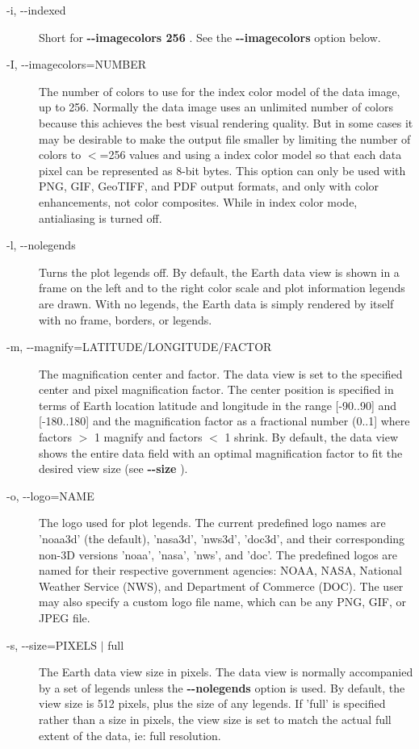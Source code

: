 \begin{description}
\item[-i, -{-}indexed]Short for \textbf{-{-}imagecolors 256}
. See the \textbf{-{-}imagecolors}
 option below.
\item[-I, -{-}imagecolors=NUMBER]The number of colors to use for the index color model of the data image, up to 256. Normally the data image uses an unlimited number of colors because this achieves the best visual rendering quality. But in some cases it may be desirable to make the output file smaller by limiting the number of colors to $<$=256 values and using a index color model so that each data pixel can be represented as 8-bit bytes. This option can only be used with PNG, GIF, GeoTIFF, and PDF output formats, and only with color enhancements, not color composites. While in index color mode, antialiasing is turned off.
\item[-l, -{-}nolegends]Turns the plot legends off. By default, the Earth data view is shown in a frame on the left and to the right color scale and plot information legends are drawn. With no legends, the Earth data is simply rendered by itself with no frame, borders, or legends.
\item[-m, -{-}magnify=LATITUDE/LONGITUDE/FACTOR]The magnification center and factor. The data view is set to the specified center and pixel magnification factor. The center position is specified in terms of Earth location latitude and longitude in the range [-90..90] and [-180..180] and the magnification factor as a fractional number (0..1] where factors $>$ 1 magnify and factors $<$ 1 shrink. By default, the data view shows the entire data field with an optimal magnification factor to fit the desired view size (see \textbf{-{-}size}
).
\item[-o, -{-}logo=NAME]The logo used for plot legends. The current predefined logo names are 'noaa3d' (the default), 'nasa3d', 'nws3d', 'doc3d', and their corresponding non-3D versions 'noaa', 'nasa', 'nws', and 'doc'. The predefined logos are named for their respective government agencies: NOAA, NASA, National Weather Service (NWS), and Department of Commerce (DOC). The user may also specify a custom logo file name, which can be any PNG, GIF, or JPEG file.
\item[-s, -{-}size=PIXELS $|$ full]The Earth data view size in pixels. The data view is normally accompanied by a set of legends unless the \textbf{-{-}nolegends}
 option is used. By default, the view size is 512 pixels, plus the size of any legends. If 'full' is specified rather than a size in pixels, the view size is set to match the actual full extent of the data, ie: full resolution.

\end{description}
